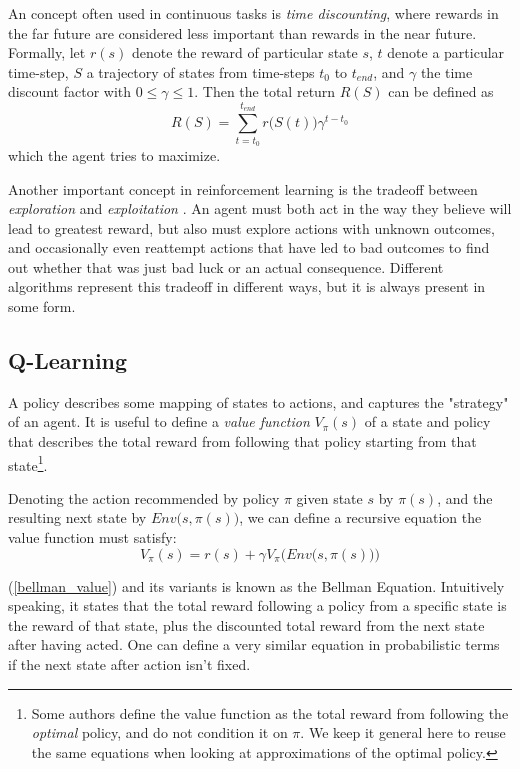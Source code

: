 An concept often used in continuous tasks is \textit{time discounting}, where rewards in the far future are considered less important than rewards in the near future. Formally, let $r(s)$ denote the reward of particular state $s$, $t$ denote a particular time-step, $S$ a trajectory of states from time-steps $t_0$ to $t_{end}$, and $\gamma$ the time discount factor with $0 \leq \gamma \leq 1$. Then the total return $R(S)$ can be defined as
\begin{equation}
    R(S) = \sum_{t=t_0}^{t_{end}}{r\big(S(t)\big)\gamma^{t-t_0}}
\end{equation}
which the agent tries to maximize.

Another important concept in reinforcement learning is the tradeoff between \textit{exploration} and \textit{exploitation} \cite[Chapter 2.1]{Sutton}. An agent must both act in the way they believe will lead to greatest reward, but also must explore actions with unknown outcomes, and occasionally even reattempt actions that have led to bad outcomes to find out whether that was just bad luck or an actual consequence. Different algorithms represent this tradeoff in different ways, but it is always present in some form.

\subsection{Q-Learning}
A policy describes some mapping of states to actions, and captures the "strategy" of an agent. It is useful to define a \textit{value function} $V_{\pi}(s)$ of a state and policy that describes the total reward from following that policy starting from that state\footnote{Some authors define the value function as the total reward from following the \textit{optimal} policy, and do not condition it on $\pi$. We keep it general here to reuse the same equations when looking at approximations of the optimal policy.}.

Denoting the action recommended by policy $\pi$ given state $s$ by $\pi(s)$, and the resulting next state by $Env\big(s, \pi(s)\big)$, we can define a recursive equation the value function must satisfy:
\begin{equation}
\label{bellman_value}
    V_{\pi}(s) = r(s) + \gamma V_{\pi} \Big(Env\big(s, \pi(s)\big)\Big)
\end{equation}

(\ref{bellman_value}) and its variants is known as the Bellman Equation. Intuitively speaking, it states that the total reward following a policy from a specific state is the reward of that state, plus the discounted total reward from the next state after having acted. One can define a very similar equation in probabilistic terms if the next state after action isn't fixed.

